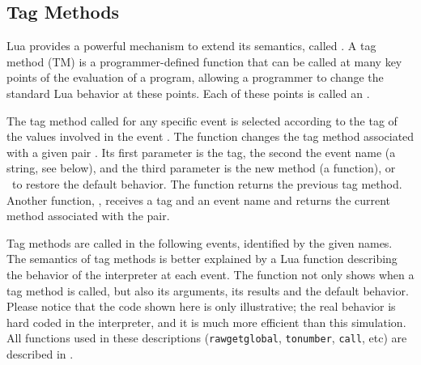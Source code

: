 \subsection{Tag Methods} \label{tag-method}

Lua provides a powerful mechanism to extend its semantics,
called .
A tag method (TM) is a programmer-defined function
that can be called at many key points of the evaluation of a program,
allowing a programmer to change the standard Lua behavior at these points.
Each of these points is called an .

The tag method called for any specific event is selected
according to the tag of the values involved
in the event .
The function  changes the tag method
associated with a given pair .
Its first parameter is the tag, the second the event name
(a string, see below),
and the third parameter is the new method (a function),
or \nil\ to restore the default behavior.
The function returns the previous tag method.
Another function, ,
receives a tag and an event name and returns the
current method associated with the pair.

Tag methods are called in the following events,
identified by the given names.
The semantics of tag methods is better explained by a Lua function
describing the behavior of the interpreter at each event.
The function not only shows when a tag method is called,
but also its arguments, its results and the default behavior.
Please notice that the code shown here is only illustrative;
the real behavior is hard coded in the interpreter,
and it is much more efficient than this simulation.
All functions used in these descriptions
(\verb|rawgetglobal|, \verb|tonumber|, \verb|call|, etc)
are described in .

